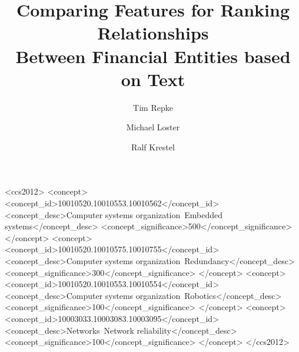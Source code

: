 \documentclass[
	format=sigconf,
	review=false]{acmart}
\title{Comparing Features for Ranking Relationships\\Between Financial Entities based on Text}
\author{Tim Repke}
\affiliation{%
	\institution{Hasso Plattner Institute}
	\city{Potsdam}
	\country{Germany}
}
\author{Michael Loster}
\affiliation{%
	\institution{Hasso Plattner Institute}
	\city{Potsdam}
	\country{Germany}
}
\author{Ralf Krestel}
\affiliation{%
	\institution{Hasso Plattner Institute}
	\city{Potsdam}
	\country{Germany}
}
\begin{document}
%

%
%
\begin{CCSXML}
<ccs2012>
 <concept>
  <concept_id>10010520.10010553.10010562</concept_id>
  <concept_desc>Computer systems organization~Embedded systems</concept_desc>
  <concept_significance>500</concept_significance>
 </concept>
 <concept>
  <concept_id>10010520.10010575.10010755</concept_id>
  <concept_desc>Computer systems organization~Redundancy</concept_desc>
  <concept_significance>300</concept_significance>
 </concept>
 <concept>
  <concept_id>10010520.10010553.10010554</concept_id>
  <concept_desc>Computer systems organization~Robotics</concept_desc>
  <concept_significance>100</concept_significance>
 </concept>
 <concept>
  <concept_id>10003033.10003083.10003095</concept_id>
  <concept_desc>Networks~Network reliability</concept_desc>
  <concept_significance>100</concept_significance>
 </concept>
</ccs2012>  
\end{CCSXML}





\maketitle




 
\end{document}
